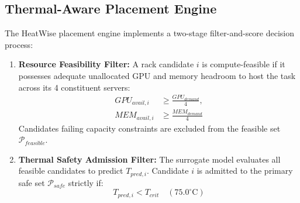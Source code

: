 \documentclass[conference,10pt]{IEEEtran}
\begin{document}
\subsection{Thermal-Aware Placement Engine}
The HeatWise placement engine implements a two-stage filter-and-score decision process:
\begin{enumerate}
    \item \textbf{Resource Feasibility Filter:} A rack candidate $i$ is compute-feasible if it possesses adequate unallocated GPU and memory headroom to host the task across its 4 constituent servers:
    \begin{equation}
    \begin{split}
    GPU_{avail,i} &\ge \frac{GPU_{demand}}{4}, \\
    MEM_{avail,i} &\ge \frac{MEM_{demand}}{4}
    \end{split}
    \end{equation}
    Candidates failing capacity constraints are excluded from the feasible set $\mathcal{P}_{feasible}$.
    \item \textbf{Thermal Safety Admission Filter:} The surrogate model evaluates all feasible candidates to predict $T_{pred,i}$. Candidate $i$ is admitted to the primary safe set $\mathcal{P}_{safe}$ strictly if:
    \begin{equation}
    T_{pred,i} < T_{crit} \quad (75.0^\circ\text{C})
    \end{equation}
\end{enumerate}
\end{document}
